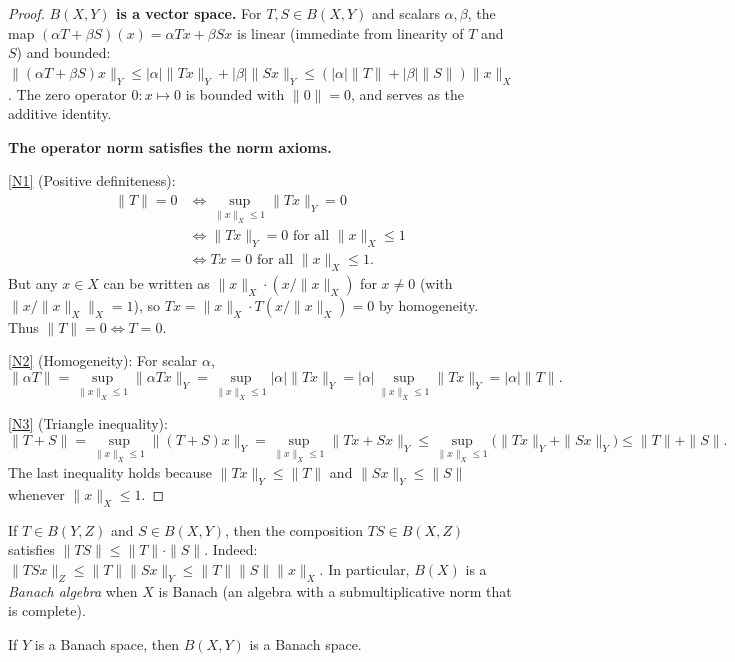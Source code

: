 \documentclass[11pt,a4paper]{article}
\begin{document}
\begin{proof}
\textbf{$B(X,Y)$ is a vector space.} For $T, S \in B(X,Y)$ and scalars
$\alpha, \beta$, the map $(\alpha T + \beta S)(x) = \alpha Tx + \beta Sx$ is
linear (immediate from linearity of $T$ and $S$) and bounded:
$\|(\alpha T + \beta S)x\|_Y \le |\alpha| \|Tx\|_Y + |\beta| \|Sx\|_Y
\le (|\alpha| \|T\| + |\beta| \|S\|) \|x\|_X$. The zero operator
$0 \colon x \mapsto 0$ is bounded with $\|0\| = 0$, and serves as the
additive identity.

\textbf{The operator norm satisfies the norm axioms.}

\ref{N1} (Positive definiteness):
\begin{align*}
\|T\| = 0
&\iff \sup_{\|x\|_X \le 1} \|Tx\|_Y = 0 \\
&\iff \|Tx\|_Y = 0 \text{ for all } \|x\|_X \le 1 \\
&\iff Tx = 0 \text{ for all } \|x\|_X \le 1.
\end{align*}
But any $x \in X$ can be written as $\|x\|_X \cdot (x/\|x\|_X)$ for $x \ne 0$
(with $\|x/\|x\|_X\|_X = 1$), so $Tx = \|x\|_X \cdot T(x/\|x\|_X) = 0$
by homogeneity. Thus $\|T\| = 0 \iff T = 0$.

\ref{N2} (Homogeneity): For scalar $\alpha$,
\[
\|\alpha T\| = \sup_{\|x\|_X \le 1} \|\alpha Tx\|_Y
= \sup_{\|x\|_X \le 1} |\alpha| \|Tx\|_Y
= |\alpha| \sup_{\|x\|_X \le 1} \|Tx\|_Y
= |\alpha| \|T\|.
\]

\ref{N3} (Triangle inequality):
\[
\|T + S\| = \sup_{\|x\|_X \le 1} \|(T+S)x\|_Y
= \sup_{\|x\|_X \le 1} \|Tx + Sx\|_Y
\le \sup_{\|x\|_X \le 1} \bigl(\|Tx\|_Y + \|Sx\|_Y\bigr)
\le \|T\| + \|S\|.
\]
The last inequality holds because $\|Tx\|_Y \le \|T\|$ and
$\|Sx\|_Y \le \|S\|$ whenever $\|x\|_X \le 1$.
\end{proof}

\begin{remark}[Submultiplicativity]
\label{rem:submult}
If $T \in B(Y, Z)$ and $S \in B(X, Y)$, then the composition
$TS \in B(X, Z)$ satisfies $\|TS\| \le \|T\| \cdot \|S\|$. Indeed:
$\|TSx\|_Z \le \|T\| \|Sx\|_Y \le \|T\| \|S\| \|x\|_X$.
In particular, $B(X)$ is a \emph{Banach algebra} when $X$ is Banach
(an algebra with a submultiplicative norm that is complete).
\end{remark}

\begin{theorem}
\label{thm:BXY_banach}
If $Y$ is a Banach space, then $B(X,Y)$ is a Banach space.
\end{theorem}
\end{document}
